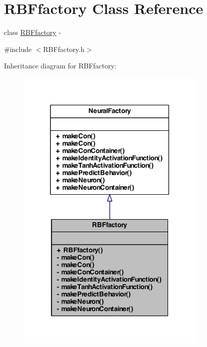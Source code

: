\hypertarget{class_r_b_ffactory}{
\section{RBFfactory Class Reference}
\label{class_r_b_ffactory}
}


class \hyperlink{class_r_b_ffactory}{RBFfactory} -\/  




{\ttfamily \#include $<$RBFfactory.h$>$}



Inheritance diagram for RBFfactory:
\nopagebreak
\begin{figure}[H]
\begin{center}
\leavevmode
\includegraphics[width=258pt]{class_r_b_ffactory__inherit__graph}
\end{center}
\end{figure}


